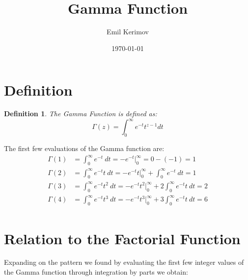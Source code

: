 \documentclass[a4paper]{article}
\title{Gamma Function}
\author{Emil Kerimov}
\date{\today}
\begin{document}
    \maketitle

    \newtheorem{theorem}{Theorem}[section]
    \newtheorem{corollary}{Corollary}[theorem]
    \newtheorem{lemma}[theorem]{Lemma}
    \newtheorem{definition}{Definition}[section]


    \section{Definition}\label{sec:definition}

    \begin{definition}
        \label{gamma-def-1}
        The Gamma Function is defined as:
        \[
        \Gamma(z) = \int_{0}^{\infty} e^{-t} t^{z-1} dt
        \]
    \end{definition}

    The first few evaluations of the Gamma function are:
    \begin{equation}
        \begin{aligned}
            \Gamma(1) &= \int_{0}^{\infty} e^{-t} \ dt  = - e^{-t}\Big|_{0}^{\infty} = 0 - (-1) = 1 \\
            \Gamma(2) &= \int_{0}^{\infty} e^{-t}  t \ dt = - e^{-t}t\Big|_{0}^{\infty} + \int_{0}^{\infty} e^{-t} \ dt = 1 \\
            \Gamma(3) &= \int_{0}^{\infty} e^{-t}  t^2 \ dt = - e^{-t}t^2\Big|_{0}^{\infty} + 2\int_{0}^{\infty} e^{-t}t \ dt = 2 \\
            \Gamma(4) &= \int_{0}^{\infty} e^{-t}  t^3 \ dt = - e^{-t}t^3\Big|_{0}^{\infty} + 3\int_{0}^{\infty} e^{-t}t \ dt = 6 \\
        \end{aligned}\label{eq:equation}
    \end{equation}


    \section{Relation to the Factorial Function}\label{sec:relation-to-the-factorial-function}
    Expanding on the pattern we found by evaluating the first few integer values of the Gamma function through integration by parts we obtain:
\end{document}
